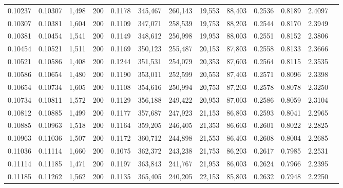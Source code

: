 \begin{tabular}{rrrrrrrrrrrrr}
0.10237 & 0.10307 &  1,498 & 200 &                                     0.1178 & 345,467 & 260,143 &  19,553 &  88,403 & 0.2536 & 0.8189 & 2.4097 \\
0.10307 & 0.10381 &  1,604 & 200 &                                     0.1109 & 347,071 & 258,539 &  19,753 &  88,203 & 0.2544 & 0.8170 & 2.3949 \\
0.10381 & 0.10454 &  1,541 & 200 &                                     0.1149 & 348,612 & 256,998 &  19,953 &  88,003 & 0.2551 & 0.8152 & 2.3806 \\
0.10454 & 0.10521 &  1,511 & 200 &                                     0.1169 & 350,123 & 255,487 &  20,153 &  87,803 & 0.2558 & 0.8133 & 2.3666 \\
0.10521 & 0.10586 &  1,408 & 200 &                                     0.1244 & 351,531 & 254,079 &  20,353 &  87,603 & 0.2564 & 0.8115 & 2.3535 \\
0.10586 & 0.10654 &  1,480 & 200 &                                     0.1190 & 353,011 & 252,599 &  20,553 &  87,403 & 0.2571 & 0.8096 & 2.3398 \\
0.10654 & 0.10734 &  1,605 & 200 &                                     0.1108 & 354,616 & 250,994 &  20,753 &  87,203 & 0.2578 & 0.8078 & 2.3250 \\
0.10734 & 0.10811 &  1,572 & 200 &                                     0.1129 & 356,188 & 249,422 &  20,953 &  87,003 & 0.2586 & 0.8059 & 2.3104 \\
0.10812 & 0.10885 &  1,499 & 200 &                                     0.1177 & 357,687 & 247,923 &  21,153 &  86,803 & 0.2593 & 0.8041 & 2.2965 \\
0.10885 & 0.10963 &  1,518 & 200 &                                     0.1164 & 359,205 & 246,405 &  21,353 &  86,603 & 0.2601 & 0.8022 & 2.2825 \\
0.10963 & 0.11036 &  1,507 & 200 &                                     0.1172 & 360,712 & 244,898 &  21,553 &  86,403 & 0.2608 & 0.8004 & 2.2685 \\
0.11036 & 0.11114 &  1,660 & 200 &                                     0.1075 & 362,372 & 243,238 &  21,753 &  86,203 & 0.2617 & 0.7985 & 2.2531 \\
0.11114 & 0.11185 &  1,471 & 200 &                                     0.1197 & 363,843 & 241,767 &  21,953 &  86,003 & 0.2624 & 0.7966 & 2.2395 \\
0.11185 & 0.11262 &  1,562 & 200 &                                     0.1135 & 365,405 & 240,205 &  22,153 &  85,803 & 0.2632 & 0.7948 & 2.2250 \\

\end{tabular}
